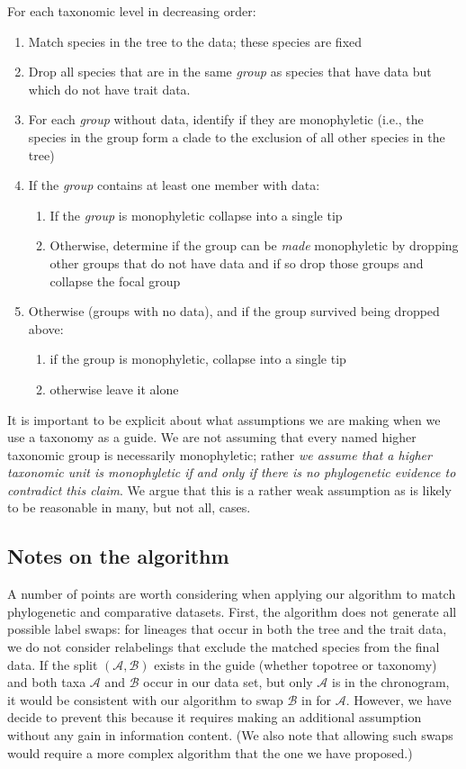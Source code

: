 \documentclass[a4paper,11pt]{article}
\begin{document}
For each taxonomic level in decreasing order:
\begin{enumerate}
  \item Match species in the tree to the data; these species are fixed
  \item Drop all species that are in the same \emph{group} as species that have data but which do not have trait data.
  \item For each \emph{group} without data, identify if they are monophyletic (i.e., the species in the group form a clade to the exclusion of all other species in the tree)
  \item If the \emph{group} contains at least one member with data:
    \begin{enumerate}
    \item If the \emph{group} is monophyletic collapse into a single tip
    \item Otherwise, determine if the group can be \emph{made} monophyletic by dropping other groups that do not have data and if so drop those groups and collapse the focal group
    \end{enumerate}
  \item Otherwise (groups with no data), and if the group survived being dropped above:
    \begin{enumerate}
    \item if the group is monophyletic, collapse into a single tip
    \item otherwise leave it alone
    \end{enumerate}
\end{enumerate}

It is important to be explicit about what assumptions we are making when we use a taxonomy as a guide. We are not assuming that every named higher taxonomic group is necessarily monophyletic; rather \emph{we assume that a higher taxonomic unit is monophyletic if and only if there is no phylogenetic evidence to contradict this claim}. We argue that this is a rather weak assumption as is likely to be reasonable in many, but not all, cases. 

\subsection{Notes on the algorithm}

A number of points are worth considering when applying our algorithm to match phylogenetic and comparative datasets. First, the algorithm does not generate all possible label swaps: for lineages that occur in both the tree and the trait data, we do not consider relabelings that exclude the matched species from the final data. If the split $(\mathcal{A,B})$ exists in the guide (whether topotree or taxonomy) and both taxa $\mathcal{A}$ and $\mathcal{B}$ occur in our data set, but only $\mathcal{A}$ is in the chronogram, it would be consistent with our algorithm to swap $\mathcal{B}$ in for $\mathcal{A}$. However, we have decide to prevent this because it requires making an additional assumption without any gain in information content. (We also note that allowing such swaps would require a more complex algorithm that the one we have proposed.) 
\end{document}
